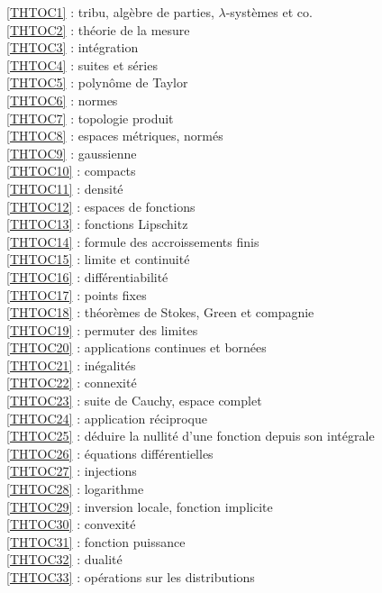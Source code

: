 \ref {THTOC1} : tribu, algèbre de parties, \( \lambda \)-systèmes et co.\\
\ref {THTOC2} : théorie de la mesure\\
\ref {THTOC3} : intégration\\
\ref {THTOC4} : suites et séries\\
\ref {THTOC5} : polynôme de Taylor\\
\ref {THTOC6} : normes\\
\ref {THTOC7} : topologie produit\\
\ref {THTOC8} : espaces métriques, normés\\
\ref {THTOC9} : gaussienne\\
\ref {THTOC10} : compacts\\
\ref {THTOC11} : densité\\
\ref {THTOC12} : espaces de fonctions\\
\ref {THTOC13} : fonctions Lipschitz\\
\ref {THTOC14} : formule des accroissements finis\\
\ref {THTOC15} : limite et continuité\\
\ref {THTOC16} : différentiabilité\\
\ref {THTOC17} : points fixes\\
\ref {THTOC18} : théorèmes de Stokes, Green et compagnie\\
\ref {THTOC19} : permuter des limites\\
\ref {THTOC20} : applications continues et bornées\\
\ref {THTOC21} : inégalités\\
\ref {THTOC22} : connexité\\
\ref {THTOC23} : suite de Cauchy, espace complet\\
\ref {THTOC24} : application réciproque\\
\ref {THTOC25} : déduire la nullité d'une fonction depuis son intégrale\\
\ref {THTOC26} : équations différentielles\\
\ref {THTOC27} : injections\\
\ref {THTOC28} : logarithme\\
\ref {THTOC29} : inversion locale, fonction implicite\\
\ref {THTOC30} : convexité\\
\ref {THTOC31} : fonction puissance\\
\ref {THTOC32} : dualité\\
\ref {THTOC33} : opérations sur les distributions\\
